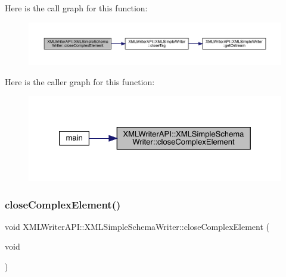 Here is the call graph for this function\+:
\nopagebreak
\begin{figure}[H]
\begin{center}
\leavevmode
\includegraphics[width=350pt]{db/d0b/classXMLWriterAPI_1_1XMLSimpleSchemaWriter_a48be6d4cbc08f03e9e76fa94107c4b8a_cgraph}
\end{center}
\end{figure}
Here is the caller graph for this function\+:\nopagebreak
\begin{figure}[H]
\begin{center}
\leavevmode
\includegraphics[width=325pt]{db/d0b/classXMLWriterAPI_1_1XMLSimpleSchemaWriter_a48be6d4cbc08f03e9e76fa94107c4b8a_icgraph}
\end{center}
\end{figure}
\mbox{\label{classXMLWriterAPI_1_1XMLSimpleSchemaWriter_a48be6d4cbc08f03e9e76fa94107c4b8a}} 
\subsubsection{\texorpdfstring{closeComplexElement()}{closeComplexElement()}\hspace{0.1cm}{\footnotesize\ttfamily [2/2]}}
{\footnotesize\ttfamily void X\+M\+L\+Writer\+A\+P\+I\+::\+X\+M\+L\+Simple\+Schema\+Writer\+::close\+Complex\+Element (\begin{DoxyParamCaption}\item[{void}]{ }\end{DoxyParamCaption})\hspace{0.3cm}{\ttfamily [inline]}}

